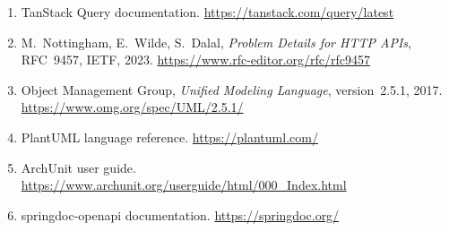 {\begin{enumerate}
  \item TanStack Query documentation. \url{https://tanstack.com/query/latest}
  \item M.~Nottingham, E.~Wilde, S.~Dalal, \emph{Problem Details for HTTP APIs}, RFC~9457, IETF, 2023. \url{https://www.rfc-editor.org/rfc/rfc9457}
  \item Object Management Group, \emph{Unified Modeling Language}, version~2.5.1, 2017. \url{https://www.omg.org/spec/UML/2.5.1/}
  \item PlantUML language reference. \url{https://plantuml.com/}
  \item ArchUnit user guide. \url{https://www.archunit.org/userguide/html/000_Index.html}
  \item springdoc-openapi documentation. \url{https://springdoc.org/}
\end{enumerate}
\par}
